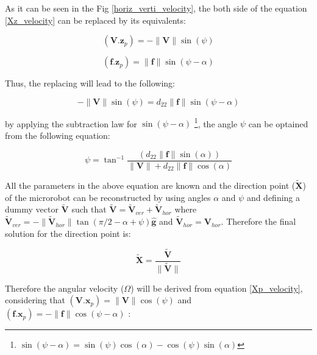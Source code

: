 \documentclass[12pt,a4paper,titlepage]{report}
\begin{document}
As it can be seen in the Fig \ref{horiz_verti_velocity}, the both side of the 
equation \ref{Xz_velocity} can be replaced by its equivalents:


\begin{equation}
(\bm{V} . \bm{z}_p) = - {\| \bm{V} \|} \sin(\psi)
\label{Xz_velocity_equival}  
\end{equation}


\begin{equation}
(\bm{f} . \bm{z}_p) = {\| \bm{f} \|} \sin(\psi - \alpha)
\label{Xz_velocity_equivali}  
\end{equation}



Thus, the replacing will lead to the following:


\begin{equation}
 - {\| \bm{V} \|} \sin(\psi) = d_{22} {\| \bm{f} \|} \sin(\psi - \alpha)
\label{finding_psi}  
\end{equation}

by applying the subtraction law for $ \sin(\psi - \alpha)$ \footnote{$\sin(\psi - \alpha) = 
\sin(\psi) \cos(\alpha) - \cos(\psi) \sin(\alpha)$},
 the angle $\psi$ can be optained from the following
equation:


\begin{equation}
  {\psi} ={{\tan}^{-1}} 
\frac{\left( d_{22} {\| \bm{f} \|} \sin(\alpha) \right)}{ \| {\bm{V} \| + d_{22} \| {\bm{f}} \|} \cos(\alpha) }
\label{psi}  
\end{equation}


All the parameters in the above equation are known and the direction point ($\tilde{\bm{X}}$) of the microrobot
 can be reconstructed by using angles $\alpha$ and $\psi$ and defining a dummy vector $\tilde{\bm{V}}$ such
that $\tilde{\bm{V}} = {\tilde{\bm{V}}}_{ver} + {\tilde{\bm{V}}}_{hor} $ where 
${\tilde{\bm{V}}}_{ver} = - \| {\tilde{\bm{V}}}_{hor} \| \tan(\pi /2 - \alpha + \psi) \hat{\bm{g}}$ and 
${\tilde{\bm{V}}}_{hor}  = {{\bm{V}}}_{hor}$. Therefore the final solution for the direction point is:



\begin{equation}
 \tilde{\bm{X} }  = \frac{\tilde{\bm{V}}}{\| {\tilde{\bm{V}}} \|}
\label{direction_point}  
\end{equation}

Therefore the angular velocity ($\Omega$) will be derived from equation \ref{Xp_velocity}, considering that
$(\bm{V} . \bm{x}_p) = \| {\bm{V}} \|  \cos({\psi})$ and $({\bm{f} . {\bm{x}}_p  }) = - \| {\bm{f}} \| \cos(\psi - \alpha) $ :
\end{document}
